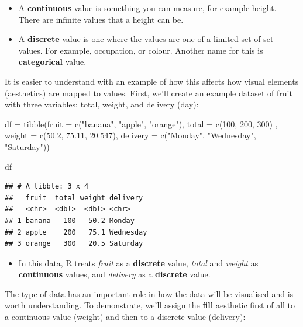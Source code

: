 \documentclass[
]{book}
\newenvironment{Shaded}{\begin{snugshade}}{\end{snugshade}}
\newcommand{\AttributeTok}[1]{\textcolor[rgb]{0.77,0.63,0.00}{#1}}
\newcommand{\DecValTok}[1]{\textcolor[rgb]{0.00,0.00,0.81}{#1}}
\newcommand{\FloatTok}[1]{\textcolor[rgb]{0.00,0.00,0.81}{#1}}
\newcommand{\FunctionTok}[1]{\textcolor[rgb]{0.00,0.00,0.00}{#1}}
\newcommand{\NormalTok}[1]{#1}
\newcommand{\OtherTok}[1]{\textcolor[rgb]{0.56,0.35,0.01}{#1}}
\newcommand{\StringTok}[1]{\textcolor[rgb]{0.31,0.60,0.02}{#1}}
\providecommand{\tightlist}{%
  \setlength{\itemsep}{0pt}\setlength{\parskip}{0pt}}
\begin{document}
\begin{itemize}
\item
  A \textbf{continuous} value is something you can measure, for example height. There are infinite values that a height can be.
\item
  A \textbf{discrete} value is one where the values are one of a limited set of set values. For example, occupation, or colour. Another name for this is \textbf{categorical} value.
\end{itemize}

It is easier to understand with an example of how this affects how visual elements (aesthetics) are mapped to values. First, we'll create an example dataset of fruit with three variables: total, weight, and delivery (day):

\begin{Shaded}
\begin{Highlighting}[]
\NormalTok{df }\OtherTok{=} \FunctionTok{tibble}\NormalTok{(}\AttributeTok{fruit =} \FunctionTok{c}\NormalTok{(}\StringTok{"banana"}\NormalTok{, }\StringTok{"apple"}\NormalTok{, }\StringTok{"orange"}\NormalTok{), }
            \AttributeTok{total =} \FunctionTok{c}\NormalTok{(}\DecValTok{100}\NormalTok{, }\DecValTok{200}\NormalTok{, }\DecValTok{300}\NormalTok{) ,}
       \AttributeTok{weight =} \FunctionTok{c}\NormalTok{(}\FloatTok{50.2}\NormalTok{, }\FloatTok{75.11}\NormalTok{, }\FloatTok{20.547}\NormalTok{), }
       \AttributeTok{delivery =} \FunctionTok{c}\NormalTok{(}\StringTok{"Monday"}\NormalTok{, }\StringTok{"Wednesday"}\NormalTok{, }\StringTok{"Saturday"}\NormalTok{))}

\NormalTok{df}
\end{Highlighting}
\end{Shaded}

\begin{verbatim}
## # A tibble: 3 x 4
##   fruit  total weight delivery 
##   <chr>  <dbl>  <dbl> <chr>    
## 1 banana   100   50.2 Monday   
## 2 apple    200   75.1 Wednesday
## 3 orange   300   20.5 Saturday
\end{verbatim}

\begin{itemize}
\tightlist
\item
  In this data, R treats \emph{fruit} as a \textbf{discrete} value, \emph{total} and \emph{weight} as \textbf{continuous} values, and \emph{delivery} as a \textbf{discrete} value.
\end{itemize}

The type of data has an important role in how the data will be visualised and is worth understanding. To demonstrate, we'll assign the \textbf{fill} aesthetic first of all to a continuous value (weight) and then to a discrete value (delivery):
\end{document}

